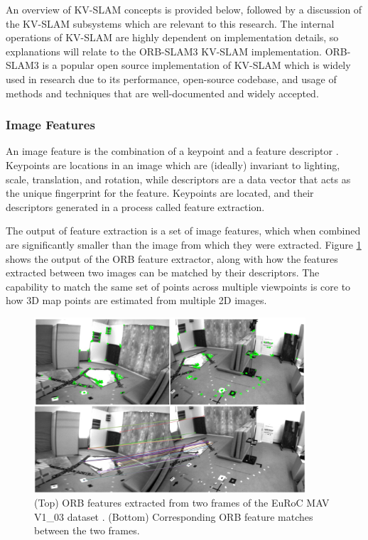 An overview of KV-SLAM concepts is provided below, followed by a discussion of the KV-SLAM subsystems which are relevant to this research. The internal operations of KV-SLAM are highly dependent on implementation details, so explanations will relate to the ORB-SLAM3 KV-SLAM implementation. ORB-SLAM3 is a popular open source implementation of KV-SLAM which is widely used in research due to its performance, open-source codebase, and usage of methods and techniques that are well-documented and widely accepted.

\subsubsection{Image Features}

An image feature is the combination of a keypoint and a feature descriptor \cite{loweObjectRecognitionLocal1999}. Keypoints are locations in an image which are (ideally) invariant to lighting, scale, translation, and rotation\cite{shiGoodFeaturesTrack1994}, while descriptors are a data vector that acts as the unique fingerprint for the feature. Keypoints are located, and their descriptors generated in a process called feature extraction.

The output of feature extraction is a set of image features, which when combined are significantly smaller than the image from which they were extracted. Figure \ref{fig:feature_extraction_and_matching} shows the output of the ORB feature extractor, along with how the features extracted between two images can be matched by their descriptors. The capability to match the same set of points across multiple viewpoints is core to how 3D map points are estimated from multiple 2D images.

\begin{figure}[!ht]
    \centering
    \includegraphics[width=0.9\textwidth]{resources/feature_extraction_and_matching.png}
    \caption[Image Feature Extraction and Matching]{(Top) ORB features extracted from two frames of the EuRoC MAV V1\_03 dataset \cite{burriEuRoCMicroAerial2016}. (Bottom) Corresponding ORB feature matches between the two frames.}
    \label{fig:feature_extraction_and_matching}
\end{figure}

